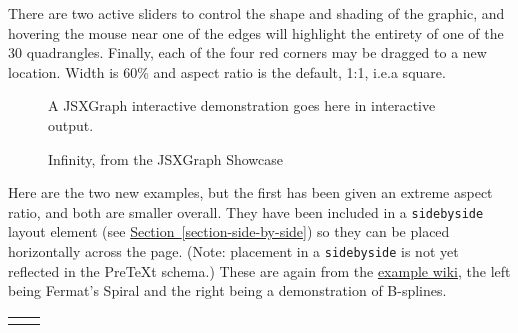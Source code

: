 \documentclass[10pt,]{article}
\theoremstyle{plain}
\theoremstyle{definition}
\theoremstyle{definition}
\theoremstyle{definition}
\theoremstyle{definition}
\theoremstyle{definition}
\theoremstyle{definition}
\numberwithin{equation}{section}
\newlength{\panelmax}
\begin{document}
\hypertarget{p-488}{}%
There are two active sliders to control the shape and shading of the graphic, and hovering the mouse near one of the edges will highlight the entirety of one of the 30 quadrangles.  Finally, each of the four red corners may be dragged to a new location.  Width is 60\% and aspect ratio is the default, 1:1, i.e.\@ a square.%
\begin{figure}
\centering
\par\smallskip\centerline{A JSXGraph interactive demonstration goes here in interactive output.}\smallskip
\caption{Infinity, from the JSXGraph Showcase\label{figure-22}}
\end{figure}
\hypertarget{p-489}{}%
Here are the two new examples, but the first has been given an extreme aspect ratio, and both are smaller overall.  They have been included in a \lstinline?sidebyside? layout element (see \hyperref[section-side-by-side]{Section~\ref{section-side-by-side}}) so they can be placed horizontally across the page.  (Note: placement in a \lstinline?sidebyside? is not yet reflected in the PreTeXt schema.)  These are again from the \href{http://jsxgraph.uni-bayreuth.de/wiki/index.php/Category:Examples}{example wiki}, the left being Fermat's Spiral and the right being a demonstration of B-splines.%
{%
\setlength{\panelmax}{0pt}
\ifdefined\panelboxAjsxgraph\else\newsavebox{\panelboxAjsxgraph}\fi%
\savebox{\panelboxAjsxgraph}{%
\parbox{70pt}{[jsxgraph]}}
\ifdefined\phAjsxgraph\else\newlength{\phAjsxgraph}\fi%
\setlength{\phAjsxgraph}{\ht\panelboxAjsxgraph+\dp\panelboxAjsxgraph}
\settototalheight{\phAjsxgraph}{\usebox{\panelboxAjsxgraph}}
\setlength{\panelmax}{\maxof{\panelmax}{\phAjsxgraph}}
\ifdefined\panelboxBjsxgraph\else\newsavebox{\panelboxBjsxgraph}\fi%
\savebox{\panelboxBjsxgraph}{%
\parbox{70pt}{[jsxgraph]}}
\ifdefined\phBjsxgraph\else\newlength{\phBjsxgraph}\fi%
\setlength{\phBjsxgraph}{\ht\panelboxBjsxgraph+\dp\panelboxBjsxgraph}
\settototalheight{\phBjsxgraph}{\usebox{\panelboxBjsxgraph}}
\setlength{\panelmax}{\maxof{\panelmax}{\phBjsxgraph}}
\leavevmode%
\setlength{\tabcolsep}{0.025\linewidth}
\par\medskip\noindent
\hspace*{0.025\linewidth}%
\begin{tabular}{@{}*{2}{c}@{}}
\begin{minipage}[c][\panelmax][t]{0.35\linewidth}\usebox{\panelboxAjsxgraph}\end{minipage}&
\begin{minipage}[c][\panelmax][t]{0.55\linewidth}\usebox{\panelboxBjsxgraph}\end{minipage}\end{tabular}\\
}%
\end{document}
